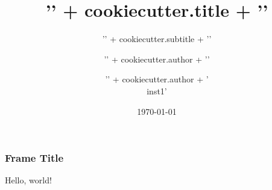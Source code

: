 \documentclass[10pt]{beamer}
\date{\today}
\title{{'{' + cookiecutter.title + '}'}}
\subtitle{{'{' + cookiecutter.subtitle + '}'}}
\author{{'{' + cookiecutter.author + '}'}}
\institute{{'{' + cookiecutter.affiliation + '}'}}
\author[shortname]{{'{' + cookiecutter.author + '\\inst{1}}'}}
\institute[shortinst]{
\inst{1}{{'{' + cookiecutter.affiliation + '}' }}
}
\begin{document}
\maketitle

%

\begin{frame}[c]
  \frametitle{Frame Title}

  Hello, world!
\end{frame}


% 
\end{document}
